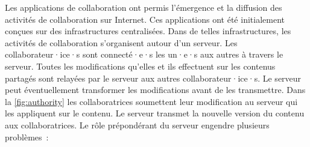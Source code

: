 
Les applications de collaboration ont permis l'émergence et la diffusion des activités de collaboration sur Internet.
Ces applications ont été initialement conçues sur des infrastructures centralisées.
Dans de telles infrastructures, les activités de collaboration s'organisent autour d'un serveur.
Les collaborateur·ice·s sont connecté·e·s les un·e·s aux autres à travers le serveur.
Toutes les modifications qu'elles et ils effectuent sur les contenus partagés sont relayées par le serveur aux autres collaborateur·ice·s.
Le serveur peut éventuellement transformer les modifications avant de les transmettre.
Dans la \autoref{fig:authority} les collaboratrices soumettent leur modification au serveur qui les appliquent sur le contenu.
Le serveur transmet la nouvelle version du contenu aux collaboratrices.
Le rôle prépondérant du serveur engendre plusieurs problèmes~:

